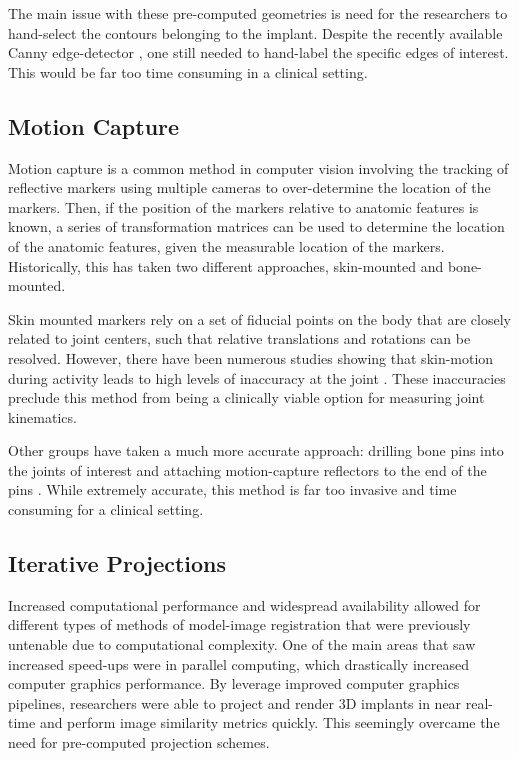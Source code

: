 The main issue with these pre-computed geometries is need for the researchers to hand-select the contours belonging to the implant. Despite the recently available Canny edge-detector \cite{cannyComputationalApproachEdge1986}, one still needed to hand-label the specific edges of interest. This would be far too time consuming in a clinical setting.


\subsection{Motion Capture}

Motion capture is a common method in computer vision involving the tracking of reflective markers using multiple cameras to over-determine the location of the markers. Then, if the position of the markers relative to anatomic features is known, a series of transformation matrices can be used to determine the location of the anatomic features, given the measurable location of the markers. Historically, this has taken two different approaches, skin-mounted and bone-mounted. 

Skin mounted markers rely on a set of fiducial points on the body that are closely related to joint centers, such that relative translations and rotations can be resolved. However, there have been numerous studies showing that skin-motion during activity leads to high levels of inaccuracy at the joint \cite{gaoInvestigationSoftTissue2008,garlingSofttissueArtefactAssessment2007,linEffectsSoftTissue2016,kuoInfluenceSoftTissue2011}. These inaccuracies preclude this method from being a clinically viable option for measuring joint kinematics.

Other groups have taken a much more accurate approach: drilling bone pins into the joints of interest and attaching motion-capture reflectors to the end of the pins \cite{lafortuneThreedimensionalKinematicsHuman1992}. While extremely accurate, this method is far too invasive and time consuming for a clinical setting.

\subsection{Iterative Projections}
Increased computational performance and widespread availability allowed for different types of methods of model-image registration that were previously untenable due to computational complexity. One of the main areas that saw increased speed-ups were in parallel computing, which drastically increased computer graphics performance. By leverage improved computer graphics pipelines, researchers were able to project and render 3D implants in near real-time and perform image similarity metrics quickly. This seemingly overcame the need for pre-computed projection schemes.


